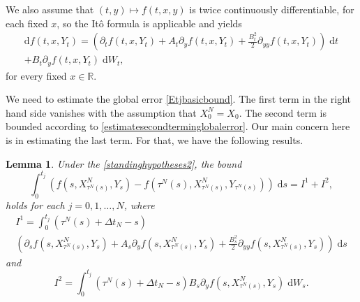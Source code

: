 \documentclass[reqno,12pt]{amsart}
\theoremstyle{plain}%
\newtheorem{lem}{Lemma}[section]
\theoremstyle{definition}
\begin{document}
We also assume that $(t, y) \mapsto f(t, x, y)$ is twice continuously differentiable, for each fixed $x$, so the It\^o formula is applicable and yields
\begin{multline}
  \label{itoformula}
  \mathrm{d}f(t, x, Y_t) = \left(\partial_t f(t, x, Y_t) + A_t \partial_y f(t, x, Y_t)  + \frac{B_t^2}{2}\partial_{yy}f(t, x, Y_t) \right) \;\mathrm{d}t \\ + B_t \partial_y f(t, x, Y_t)\;\mathrm{d}W_t,
\end{multline}
for every fixed $x\in \mathbb{R}$.

We need to estimate the global error \eqref{Etjbasicbound}. The first term in the right hand side vanishes with the assumption that $X_0^N = X_0$. The second term is bounded according to \cref{estimatesecondterminglobalerror}. Our main concern here is in estimating the last term. For that, we have the following results.

\begin{lem}
    \label{lemrewritenoiseterm}
    Under the \cref{standinghypotheses2}, the bound
    \begin{equation}
        \label{rewritenoiseterm}
        \int_0^{t_j} \left( f(s, X_{\tau^N(s)}^N, Y_s) - f(\tau^N(s), X_{\tau^N(s)}^N, Y_{\tau^N(s)}) \right)\;\mathrm{d}s = I^1 + I^2,
    \end{equation}
    holds for each $j = 0, 1, \ldots, N$, where
    \begin{multline*}
        I^1 = \int_0^{t_j} (\tau^N(s) + \Delta t_N - s) \\
        \left(\partial_s f(s, X_{\tau^N(s)}^N, Y_s) + A_s \partial_y f(s, X_{\tau^N(s)}^N, Y_s)  + \frac{B_s^2}{2}\partial_{yy}f(s, X_{\tau^N(s)}^N, Y_s) \right) \;\mathrm{d}s
    \end{multline*}
    and
    \[
        I^2 = \int_0^{t_j} (\tau^N(s) + \Delta t_N - s) B_s \partial_y f(s, X_{\tau^N(s)}^N, Y_s) \;\mathrm{d}W_s.
    \]
\end{lem}
\end{document}
